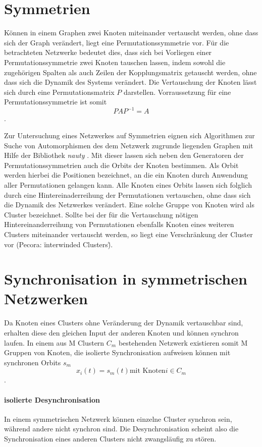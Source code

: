 \section{Symmetrien}
Können in einem Graphen zwei Knoten miteinander vertauscht werden, ohne dass sich der Graph verändert, liegt eine Permutationssymmetrie vor. Für die betrachteten Netzwerke bedeutet dies, dass sich bei Vorliegen einer Permutationssymmetrie zwei Knoten tauschen lassen, indem sowohl die zugehörigen Spalten als auch Zeilen der Kopplungsmatrix getauscht werden, ohne dass sich die Dynamik des Systems verändert. Die Vertauschung der Knoten lässt sich durch eine Permutationsmatrix $P$ darstellen. Vorraussetzung für eine Permutationssymmetrie ist somit
\begin{equation}
PAP^{-1}=A
\end{equation}.

Zur Untersuchung eines Netzwerkes auf Symmetrien eignen sich Algorithmen zur Suche von Automorphismen des dem Netzwerk zugrunde liegenden Graphen mit Hilfe der Bibliothek \textit{nauty} \cite{nauty}. Mit dieser lassen sich neben den Generatoren der Permutationssymmetrien auch die Orbits der Knoten bestimmen. Als Orbit werden hierbei die Positionen bezeichnet, an die ein Knoten durch Anwendung aller Permutationen gelangen kann. Alle Knoten eines Orbits lassen sich folglich durch eine Hintereinaderreihung der Permutationen vertauschen, ohne dass sich die Dynamik des Netzwerkes verändert. Eine solche Gruppe von Knoten wird als Cluster bezeichnet. Sollte bei der für die Vertauschung nötigen Hintereinanderreihung von Permutationen ebenfalls Knoten eines weiteren Clusters miteinander vertauscht werden, so liegt eine Verschränkung der Cluster vor (Pecora: \"interwinded Clusters\").

\section{Synchronisation in symmetrischen Netzwerken}
Da Knoten eines Clusters ohne Veränderung der Dynamik vertauschbar sind, erhalten diese den gleichen Input der anderen Knoten und können synchron laufen. In einem aus M Clustern $C_m$ bestehenden Netzwerk existieren somit M Gruppen von Knoten, die isolierte Synchronisation aufweisen können mit synchronen Orbits $s_m$
\begin{equation}
x_i(t)=s_m(t) \text{mit Knoten} i\in C_m
\end{equation}.

\paragraph{isolierte Desynchronisation}
In einem symmetrischen Netzwerk können einzelne Cluster synchron sein, während andere nicht synchron sind. Die Desynchronisation scheint also die Synchronisation eines anderen Clusters nicht zwangsläufig zu stören.

